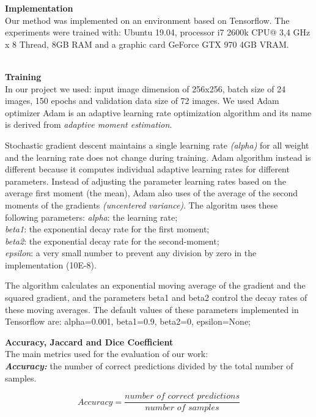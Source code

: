 \documentclass[12pt,a4paper,oneside]{report} %
\begin{document}
{\LARGE{\bf Implementation}}\\

Our method was implemented on an environment based on Tensorflow. The experiments were trained with: Ubuntu 19.04, processor i7 2600k CPU@ 3,4 GHz x 8 Thread, 8GB RAM 
and a graphic card GeForce GTX 970 4GB VRAM.
\\
\\
{\LARGE{\bf Training}}\\

In our project we used: input image dimension of 256x256, batch size of 24 images, 150 epochs and validation data size of 72 images. 
We used Adam optimizer Adam is an adaptive learning rate optimization algorithm and its name is derived from \textit{adaptive moment estimation}.
\newline

Stochastic gradient descent maintains a single learning rate \textit{(alpha)} for all weight and the learning rate does not change during training. Adam algorithm instead is different 
because it computes individual adaptive learning rates for different parameters.
Instead of adjusting the parameter learning rates based on the average first moment (the mean), Adam also uses of the average of the second moments of the gradients 
\textit{(uncentered variance)}.
The algoritm uses these following parameters:
\textit{alpha}: the learning rate;\\
\textit{beta1}: the exponential decay rate for the first moment;\\
\textit{beta2}: the exponential decay rate for the second-moment;\\
\textit{epsilon}: a very small number to prevent any division by zero in the implementation (10E-8).
\newline

The algorithm calculates an exponential moving average of the gradient and the squared gradient, and the parameters beta1 and beta2 control the decay rates of these 
moving averages.
The default values of these parameters implemented in Tensorflow are: alpha=0.001, beta1=0.9, beta2=0, epsilon=None;
\\
\newpage
{} 
{\LARGE{\bf Accuracy, Jaccard and Dice Coefficient}}\\

The main metrics used for the evaluation of our work:\\
\textbf{\textit {Accuracy:}} the number of correct predictions divided by the total number of samples. \begin{center}
\begin{equation}
Accuracy=\frac{\textit {number of correct predictions}}{\textit {number of samples}} 
\label{eq:acc}
\end{equation}
\end{center}
\end{document}
